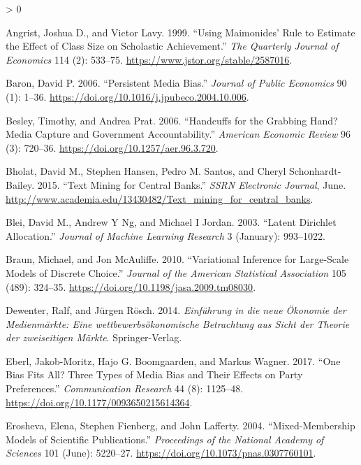 \documentclass[
  12pt,
]{article}
\newlength{\cslhangindent}
\newenvironment{CSLReferences}[2] %
 {%
  \setlength{\parindent}{0pt}
  \ifodd #1 \everypar{\setlength{\hangindent}{\cslhangindent}}\ignorespaces\fi
  \ifnum #2 > 0
  \setlength{\parskip}{#2\baselineskip}
  \fi
 }%
 {}
\begin{document}
\hypertarget{refs}{}
\begin{CSLReferences}{1}{0}
\leavevmode\hypertarget{ref-angrist_using_1999}{}%
Angrist, Joshua D., and Victor Lavy. 1999. {``Using Maimonides' Rule to
Estimate the Effect of Class Size on Scholastic Achievement.''}
\emph{The Quarterly Journal of Economics} 114 (2): 533--75.
\url{https://www.jstor.org/stable/2587016}.

\leavevmode\hypertarget{ref-baron_persistent_2006}{}%
Baron, David P. 2006. {``Persistent Media Bias.''} \emph{Journal of
Public Economics} 90 (1): 1--36.
\url{https://doi.org/10.1016/j.jpubeco.2004.10.006}.

\leavevmode\hypertarget{ref-besley_handcuffs_2006}{}%
Besley, Timothy, and Andrea Prat. 2006. {``Handcuffs for the Grabbing
Hand? Media Capture and Government Accountability.''} \emph{American
Economic Review} 96 (3): 720--36.
\url{https://doi.org/10.1257/aer.96.3.720}.

\leavevmode\hypertarget{ref-bholat_text_2015}{}%
Bholat, David M., Stephen Hansen, Pedro M. Santos, and Cheryl
Schonhardt-Bailey. 2015. {``Text Mining for Central Banks.''}
\emph{{SSRN} Electronic Journal}, June.
\url{http://www.academia.edu/13430482/Text_mining_for_central_banks}.

\leavevmode\hypertarget{ref-blei_latent_2003}{}%
Blei, David M., Andrew Y Ng, and Michael I Jordan. 2003. {``Latent
Dirichlet Allocation.''} \emph{Journal of Machine Learning Research} 3
(January): 993--1022.

\leavevmode\hypertarget{ref-braun_variational_2010}{}%
Braun, Michael, and Jon McAuliffe. 2010. {``Variational Inference for
Large-Scale Models of Discrete Choice.''} \emph{Journal of the American
Statistical Association} 105 (489): 324--35.
\url{https://doi.org/10.1198/jasa.2009.tm08030}.

\leavevmode\hypertarget{ref-dewenter_einfuhrung_2014}{}%
Dewenter, Ralf, and Jürgen Rösch. 2014. \emph{Einführung in die neue
Ökonomie der Medienmärkte: Eine wettbewerbsökonomische Betrachtung aus
Sicht der Theorie der zweiseitigen Märkte}. Springer-Verlag.

\leavevmode\hypertarget{ref-eberl_one_2017}{}%
Eberl, Jakob-Moritz, Hajo G. Boomgaarden, and Markus Wagner. 2017.
{``One Bias Fits All? Three Types of Media Bias and Their Effects on
Party Preferences.''} \emph{Communication Research} 44 (8): 1125--48.
\url{https://doi.org/10.1177/0093650215614364}.

\leavevmode\hypertarget{ref-erosheva_mixed-membership_2004}{}%
Erosheva, Elena, Stephen Fienberg, and John Lafferty. 2004.
{``Mixed-Membership Models of Scientific Publications.''}
\emph{Proceedings of the National Academy of Sciences} 101 (June):
5220--27. \url{https://doi.org/10.1073/pnas.0307760101}.


\end{CSLReferences}
\end{document}
